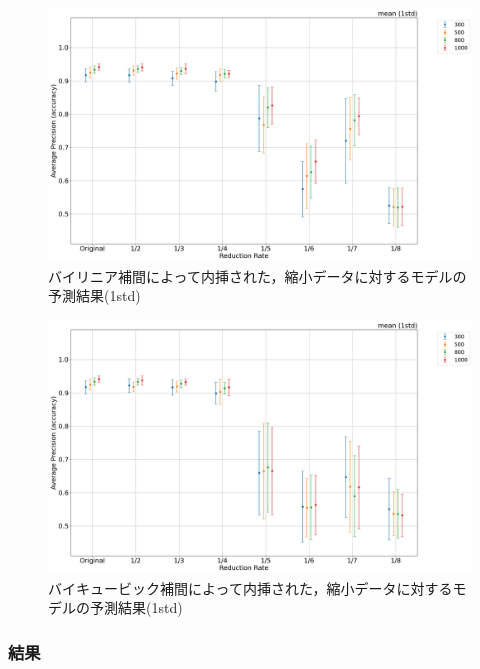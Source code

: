 \documentclass[a4j, 11pt]{jreport}
\begin{document}
\begin{figure}[H]
  \centering
  \includegraphics[width=1.0\hsize, keepaspectratio]{images/5syou/print_errorbar/linear/acc_with_errorbar_syuron5_linear_900epoch_30run_num_of_gal_comparison_acc_max_std1sigma.png}
  \caption{バイリニア補間によって内挿された，縮小データに対するモデルの予測結果(1std)}
  \label{fig:linear_num_of_gal_comparison_1std}
\end{figure}

\begin{figure}[H]
  \centering
  \includegraphics[width=1.0\hsize, keepaspectratio]{images/5syou/print_errorbar/cubic/acc_with_errorbar_syuron5_cubic_900epoch_30run_num_of_gal_comparison_acc_max_std1sigma.png}
  \caption{バイキュービック補間によって内挿された，縮小データに対するモデルの予測結果(1std)}
  \label{fig:cubic_num_of_gal_comparison_1std}
\end{figure}

\subsubsection{結果}
\end{document}
